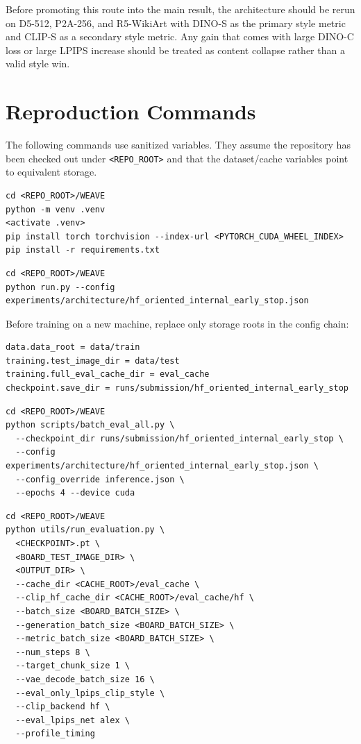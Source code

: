\documentclass[10pt,twocolumn]{article}
\newcommand{\dinos}{DINO-S}
\newcommand{\dinoc}{DINO-C}
\newcommand{\clips}{CLIP-S}
\begin{document}
Before promoting this route into the main result, the architecture should be rerun on
D5-512, P2A-256, and R5-WikiArt with \dinos{} as the primary style metric and
\clips{} as a secondary style metric. Any gain that comes with large \dinoc{} loss or
large LPIPS increase should be treated as content collapse rather than a valid style win.

\section{Reproduction Commands}

The following commands use sanitized variables. They assume the repository has been
checked out under \texttt{<REPO\_ROOT>} and that the dataset/cache variables point to
equivalent storage.

\begin{lstlisting}[style=cmd,caption={Environment setup}]
cd <REPO_ROOT>/WEAVE
python -m venv .venv
<activate .venv>
pip install torch torchvision --index-url <PYTORCH_CUDA_WHEEL_INDEX>
pip install -r requirements.txt
\end{lstlisting}

\begin{lstlisting}[style=cmd,caption={Train the D5-512 paper checkpoint}]
cd <REPO_ROOT>/WEAVE
python run.py --config experiments/architecture/hf_oriented_internal_early_stop.json
\end{lstlisting}

Before training on a new machine, replace only storage roots in the config chain:
\begin{lstlisting}[style=cmd]
data.data_root = data/train
training.test_image_dir = data/test
training.full_eval_cache_dir = eval_cache
checkpoint.save_dir = runs/submission/hf_oriented_internal_early_stop
\end{lstlisting}

\begin{lstlisting}[style=cmd,caption={Evaluate a trained checkpoint on D5-512}]
cd <REPO_ROOT>/WEAVE
python scripts/batch_eval_all.py \
  --checkpoint_dir runs/submission/hf_oriented_internal_early_stop \
  --config experiments/architecture/hf_oriented_internal_early_stop.json \
  --config_override inference.json \
  --epochs 4 --device cuda
\end{lstlisting}

\begin{lstlisting}[style=cmd,caption={Evaluate P2A-256 or R5 by swapping roots}]
cd <REPO_ROOT>/WEAVE
python utils/run_evaluation.py \
  <CHECKPOINT>.pt \
  <BOARD_TEST_IMAGE_DIR> \
  <OUTPUT_DIR> \
  --cache_dir <CACHE_ROOT>/eval_cache \
  --clip_hf_cache_dir <CACHE_ROOT>/eval_cache/hf \
  --batch_size <BOARD_BATCH_SIZE> \
  --generation_batch_size <BOARD_BATCH_SIZE> \
  --metric_batch_size <BOARD_BATCH_SIZE> \
  --num_steps 8 \
  --target_chunk_size 1 \
  --vae_decode_batch_size 16 \
  --eval_only_lpips_clip_style \
  --clip_backend hf \
  --eval_lpips_net alex \
  --profile_timing
\end{lstlisting}
\end{document}
